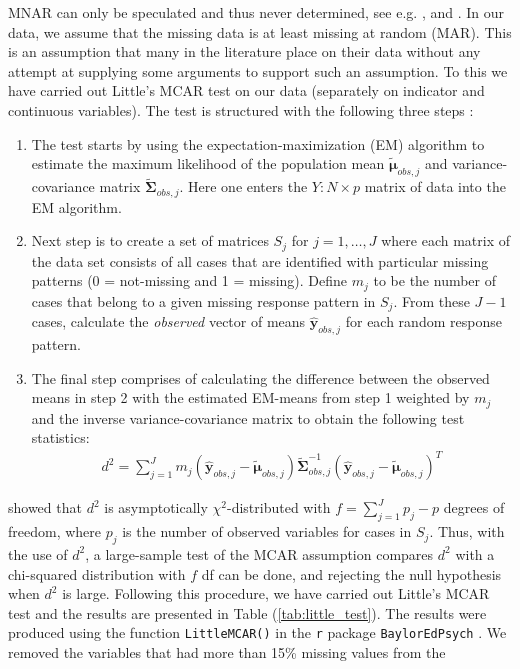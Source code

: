 \documentclass[../thesis.tex]{subfiles}
\begin{document}
\noindent MNAR can only be speculated and thus never determined, see e.g. \cite{rubin1976inference}, \cite{schafer2002missing} and \cite{moons2006using}. In our data, we assume that the missing data is at least missing at random (MAR). This is an assumption that many in the literature place on their data without any attempt at supplying some arguments to support such an assumption. To this we have carried out Little's MCAR test \citep{little1988test} on our data (separately on indicator and continuous variables). The test is structured with the following three steps : 
\begin{enumerate}[label=(\roman*)]
    \item The test starts by using the expectation-maximization (EM) algorithm \citep{dempster1977maximum} to estimate the maximum likelihood of the population mean $\bm{\tilde{\mu}}_{obs, j}$ and variance-covariance matrix $\bm{\tilde{\Sigma}}_{obs,j}$. Here one enters the $Y:N\times p$ matrix of data into the EM algorithm.
    \item Next step is to create a set of matrices $S_j$ for $j = 1, \hdots, J$ where each matrix of the data set consists of all cases that are identified with particular missing patterns (0 = not-missing and 1 = missing). Define $m_j$ to be the number of cases that belong to a given missing response pattern in $S_j$. From these $J-1$ cases, calculate the \textit{observed} vector of means $\bm{\hat{y}}_{obs, j}$ for each random response pattern. 
    \item The final step comprises of calculating the difference between the observed means in step 2 with the estimated EM-means from step 1 weighted by $m_j$ and the inverse variance-covariance matrix to obtain the following test statistics:
    \begin{align}
        d^2 = \sum_{j=1}^J m_j \left(\bm{\hat{y}}_{obs, j} -  \bm{\tilde{\mu}}_{obs, j}\right)\bm{\tilde{\Sigma}}_{obs,j}^{-1}\left(\bm{\hat{y}}_{obs, j} -  \bm{\tilde{\mu}}_{obs, j}\right)^T
    \end{align}
\end{enumerate}

\noindent \cite{little1988test} showed that $d^2$ is asymptotically $\chi^2$-distributed with $f = \sum_{j=1}^J p_j - p$ degrees of freedom, where $p_j$ is the number of observed variables for cases in $S_j$. Thus, with the use of $d^2$, a large-sample test of the MCAR assumption compares $d^2$ with a chi-squared distribution with $f$ df can be done, and rejecting the null hypothesis when $d^2$ is large. Following this procedure, we have carried out Little's MCAR test and the results are presented in Table (\ref{tab:little_test}). The results were produced using the function \texttt{LittleMCAR()} in the \texttt{r} package \texttt{BaylorEdPsych} \citep{BaylorEdPsych}. We removed the variables that had more than 15\% missing values from the
\end{document}
